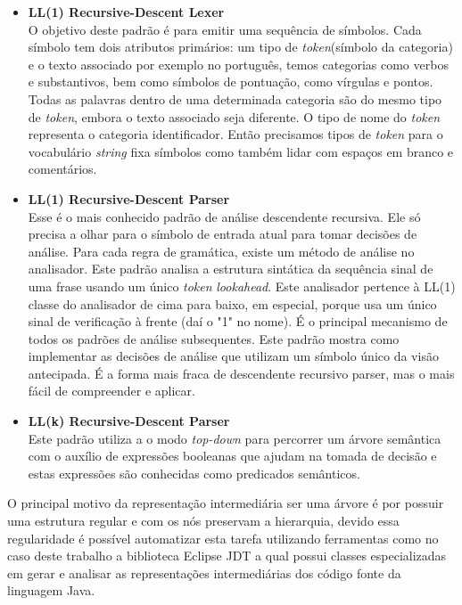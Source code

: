 \begin{itemize}
	\item \textbf{LL(1) Recursive-Descent Lexer}\\
	O objetivo deste padr\~{a}o \'{e} para emitir uma sequência de s\'{i}mbolos. Cada s\'{i}mbolo tem dois atributos prim\'{a}rios: um tipo de \textit{token}(s\'{i}mbolo da categoria) e o texto associado por exemplo 
	no português, temos categorias como verbos e substantivos, bem como s\'{i}mbolos de pontuaç\~{a}o, como v\'{i}rgulas e pontos. Todas as palavras dentro de uma determinada categoria s\~{a}o do mesmo tipo de \textit{token}, embora o texto associado seja diferente. O tipo de nome do \textit{token} representa o categoria identificador. Ent\~{a}o precisamos tipos de \textit{token} para o vocabul\'{a}rio \textit{string} fixa s\'{i}mbolos como tamb\'{e}m lidar com espaços em branco e coment\'{a}rios.
	\item \textbf{LL(1) Recursive-Descent Parser}\\
	Esse \'{e} o mais conhecido padr\~{a}o de an\'{a}lise descendente recursiva. Ele s\'{o} precisa	a olhar para o s\'{i}mbolo de entrada atual para tomar decis\~{o}es de an\'{a}lise. Para cada regra de gram\'{a}tica, existe um m\'{e}todo de an\'{a}lise no analisador. Este padr\~{a}o analisa a estrutura sint\'{a}tica da sequência sinal de uma frase usando um \'{u}nico \textit{token} \textit{lookahead}. Este analisador pertence à LL(1) classe do analisador de cima para baixo, em especial, porque usa um \'{u}nico sinal de verificaç\~{a}o à frente (da\'{i} o "1" no nome). É o principal mecanismo de todos os padr\~{o}es de an\'{a}lise subsequentes. Este padr\~{a}o mostra como implementar as decis\~{o}es de an\'{a}lise que utilizam um s\'{i}mbolo \'{u}nico da vis\~{a}o antecipada. É a forma mais fraca de descendente recursivo parser, mas o mais f\'{a}cil de compreender e aplicar.
	\item \textbf{LL(k) Recursive-Descent Parser}\\
	Este padr\~{a}o utiliza a o modo \textit{top-down} para percorrer um \'{a}rvore sem\^{a}ntica com o aux\'{i}lio de express\~{o}es booleanas que ajudam na tomada de decis\~{a}o e estas express\~{o}es s\~{a}o conhecidas como predicados sem\^{a}nticos.
\end{itemize}


O principal motivo da representa\c{c}\~{a}o intermedi\'{a}ria ser uma \'{a}rvore \'{e} por possuir uma estrutura regular e com os n\'{o}s preservam a hierarquia, devido essa regularidade \'{e} poss\'{i}vel automatizar esta tarefa utilizando ferramentas como no caso deste trabalho a biblioteca Eclipse JDT a qual possui classes especializadas em gerar e analisar as representa\c{c}\~{o}es intermedi\'{a}rias dos c\'{o}digo fonte da linguagem Java.





